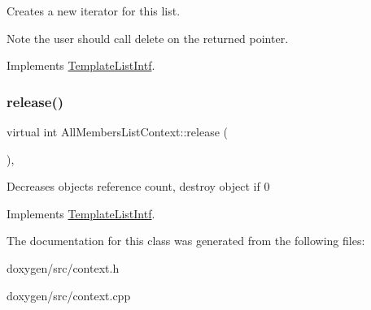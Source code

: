 Creates a new iterator for this list. \begin{DoxyNote}{Note}
the user should call delete on the returned pointer. 
\end{DoxyNote}


Implements \mbox{\hyperlink{class_template_list_intf_a56b82384db24c3e121076a1da046d378}{Template\+List\+Intf}}.

\mbox{\label{class_all_members_list_context_a7b3690135afdc30e9e6f3e2dbb9265cc}} 
\subsubsection{\texorpdfstring{release()}{release()}}
{\footnotesize\ttfamily virtual int All\+Members\+List\+Context\+::release (\begin{DoxyParamCaption}{ }\end{DoxyParamCaption})\hspace{0.3cm}{\ttfamily [inline]}, {\ttfamily [virtual]}}

Decreases object\textquotesingle{}s reference count, destroy object if 0 

Implements \mbox{\hyperlink{class_template_list_intf_a0c53169c740c09dac47efc62bbe39674}{Template\+List\+Intf}}.



The documentation for this class was generated from the following files\+:\begin{DoxyCompactItemize}
\item 
doxygen/src/context.\+h\item 
doxygen/src/context.\+cpp\end{DoxyCompactItemize}
